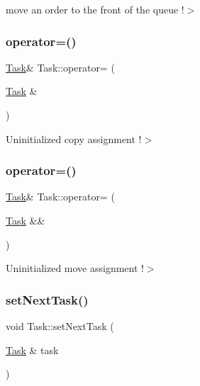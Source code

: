 move an order to the front of the queue !$>$ \mbox{\label{class_task_a95c7171fb2f939f1e4ae9a82f1c7c32d}} 
\subsubsection{\texorpdfstring{operator=()}{operator=()}\hspace{0.1cm}{\footnotesize\ttfamily [1/2]}}
{\footnotesize\ttfamily \mbox{\hyperlink{class_task}{Task}}\& Task\+::operator= (\begin{DoxyParamCaption}\item[{\mbox{\hyperlink{class_task}{Task}} \&}]{ }\end{DoxyParamCaption})\hspace{0.3cm}{\ttfamily [delete]}}

Uninitialized copy assignment !$>$ \mbox{\label{class_task_ada7e932e1a40e87069806c264ca3b2c5}} 
\subsubsection{\texorpdfstring{operator=()}{operator=()}\hspace{0.1cm}{\footnotesize\ttfamily [2/2]}}
{\footnotesize\ttfamily \mbox{\hyperlink{class_task}{Task}}\& Task\+::operator= (\begin{DoxyParamCaption}\item[{\mbox{\hyperlink{class_task}{Task}} \&\&}]{ }\end{DoxyParamCaption})\hspace{0.3cm}{\ttfamily [delete]}}

Uninitialized move assignment !$>$ \mbox{\label{class_task_aca65eac4162faecd7cce47db096183fc}} 
\subsubsection{\texorpdfstring{set\+Next\+Task()}{setNextTask()}}
{\footnotesize\ttfamily void Task\+::set\+Next\+Task (\begin{DoxyParamCaption}\item[{\mbox{\hyperlink{class_task}{Task}} \&}]{task }\end{DoxyParamCaption})}

